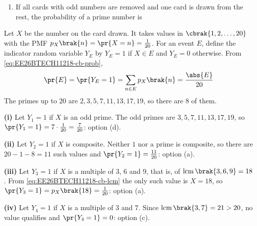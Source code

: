 \begin{enumerate}[label=\thesubsection.\arabic*, ref=\thesubsection.\theenumi,itemsep=1.5em]
\begin{enumerate}[label=(\roman*), itemsep=0pt]
\begin{enumerate}[label=\alph*), itemsep=0pt]
\end{enumerate}
\item If all cards with odd numbers are removed and one card is drawn from the rest, the probability of a prime number is
\begin{enumerate}[label=\alph*), itemsep=0pt]
\end{enumerate}
\end{enumerate}
\solution
Let $X$ be the number on the card drawn. It takes values in $\cbrak{1,2,\dots,20}$ with the PMF $p_X\brak{n}=\pr{X=n}=\frac{1}{20}$. For an event $E$, define the indicator random variable $Y_E$ by $Y_E=1$ if $X\in E$ and $Y_E=0$ otherwise. From \eqref{eq:EE26BTECH11218-cb-prob},
\begin{align}
\pr{E} = \pr{Y_E=1} = \sum_{n\in E}p_X\brak{n} = \frac{\abs{E}}{20}
\end{align}
The primes up to $20$ are $2,3,5,7,11,13,17,19$, so there are $8$ of them.

\textbf{(i)} Let $Y_1=1$ if $X$ is an odd prime. The odd primes are $3,5,7,11,13,17,19$, so $\pr{Y_1=1}=7\cdot\frac{1}{20}=\frac{7}{20}$: option (d).

\textbf{(ii)} Let $Y_2=1$ if $X$ is composite. Neither $1$ nor a prime is composite, so there are $20-1-8=11$ such values and $\pr{Y_2=1}=\frac{11}{20}$: option (a).

\textbf{(iii)} Let $Y_3=1$ if $X$ is a multiple of $3$, $6$ and $9$, that is, of $\operatorname{lcm}\brak{3,6,9}=18$. From \eqref{eq:EE26BTECH11218-cb-lcm} the only such value is $X=18$, so $\pr{Y_3=1}=p_X\brak{18}=\frac{1}{20}$: option (a).

\textbf{(iv)} Let $Y_4=1$ if $X$ is a multiple of $3$ and $7$. Since $\operatorname{lcm}\brak{3,7}=21>20$, no value qualifies and $\pr{Y_4=1}=0$: option (c).


\end{enumerate}
